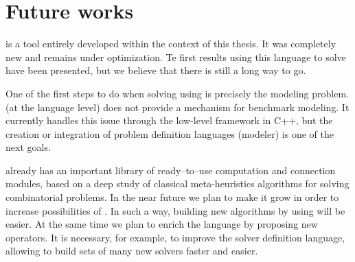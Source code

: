 
\section{Future works}

\posl{} is a tool entirely developed within the context of this thesis. It was completely new and remains under optimization. Te first results using this language to solve \CSPs{} have been presented, but we believe that there is still a long way to go. 

One of the first steps to do when solving \csps{} using \posl{} is precisely the modeling problem. \posl{} (at the language level) does not provide a mechanism for benchmark modeling. It currently handles this issue through the low-level framework in C++, but the creation or integration of problem definition languages (\ie modeler) is one of the next goals. 


\posl{} already has an important library of ready--to--use computation and connection modules, based on a deep study of classical meta-heuristics algorithms for solving combinatorial problems. In the near future we plan to make it grow in order to increase possibilities of \posl{}. In such a way, building new algorithms by using \posl{} will be easier. At the same time we plan to enrich the language by proposing new operators. It is necessary, for example, to improve the solver definition language, allowing to build sets of many new solvers faster and easier. 

